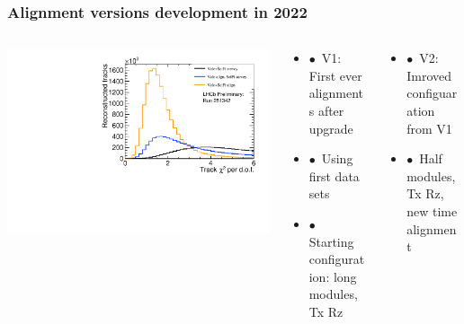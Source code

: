 \documentclass[aspectratio=1610, 12pt, xcolor=dvipsnames]{beamer}
\begin{document}
\begin{frame}\frametitle{Alignment versions development in 2022}
  \begin{columns}
    \begin{column}[c]{0.4\textwidth}
      \centering
      \includegraphics[width=\textwidth]{logos/LHCb-FIGURE-2022-018/Run251342Preliminary_BestLong_chi2_per_ndof.pdf}
    \end{column}
    \begin{column}[c]{0.3\textwidth}
      \begin{itemize}
        \item $\bullet$\, V1: First ever alignments after upgrade
      	\item $\bullet$\, Using first data sets
        \item $\bullet$\, Starting configuration: long modules, Tx Rz
      \end{itemize}
    \end{column}
    \begin{column}[c]{0.3\textwidth}
      \begin{itemize}
        \item $\bullet$\, V2: Imroved configuaration from V1 %
        \item $\bullet$\, Half modules, Tx Rz, new time alignment
      \end{itemize}
    \end{column}
  \end{columns}
\end{frame}
\end{document}
